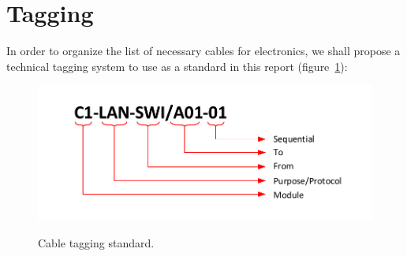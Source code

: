 \section{Tagging} \label{CABLE_TAGGING}
In order to organize the list of necessary cables for electronics, we shall propose a technical tagging system to use as a standard in this report (figure~\ref{FIG:TAGGING}):


\begin{figure}[H]
  \centering
  \includegraphics[width=1\columnwidth]{figs/tables/Tagging.pdf}\\
  \caption[Cable tagging standard]{Cable tagging standard.}
  \label{FIG:TAGGING}
\end{figure}

